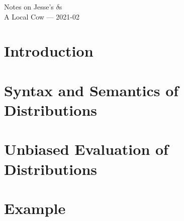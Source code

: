 \documentclass{article}
\begin{document}
    \begin{center}
        \Large Notes on Jesse's $\delta$s\\
        \large A Local Cow --- 2021-02
    \end{center}

\section*{Introduction}
    
\section*{Syntax and Semantics of Distributions}
    
\section*{Unbiased Evaluation of Distributions}
\section*{Example}
\end{document}

